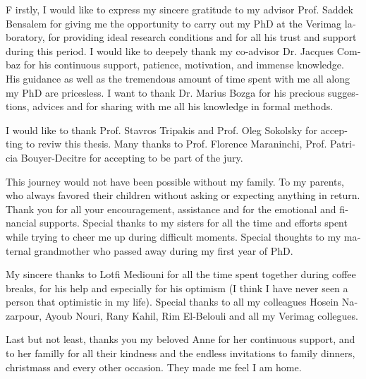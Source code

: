 \begin{acknowledgements}
\begin{otherlanguage}{french}
\ackfont
\large
\lettrine[lines=3,loversize=0.2]{\color{BrickRed}F}{} irstly, I would like to express my 
sincere gratitude to my advisor Prof. Saddek Bensalem for giving me the opportunity to carry 
out my PhD at the Verimag laboratory, for providing ideal research
conditions and for all his trust and support during this period. 
I would like to deepely thank my co-advisor Dr. Jacques Combaz for his continuous support, 
patience, motivation, and immense knowledge. His guidance as well as the tremendous 
amount of time spent with me all along my PhD are pricesless.
I want to thank Dr. Marius Bozga for his precious suggestions, advices and for 
sharing with me all his knowledge in formal methods.

I would like to thank Prof. Stavros Tripakis and Prof. Oleg Sokolsky for accepting to reviw this
thesis. Many thanks to Prof. Florence Maraninchi, Prof. Patricia Bouyer-Decitre for accepting 
to be part of the jury.
  
This journey would not have been possible without my family. To my parents, who always favored
their children without asking or expecting anything in return. Thank you for all your 
encouragement, assistance and for the emotional and financial supports. Special thanks to my 
sisters for all the time and efforts spent while trying to cheer me up during difficult moments.
Special thoughts to my maternal grandmother who passed away during my first year of PhD.
  
My sincere thanks to Lotfi Mediouni for all the time spent together during coffee breaks, for
his help and especially for his optimism (I think I have never seen a person that optimistic
in my life). Special thanks to all my colleagues Hosein Nazarpour, Ayoub Nouri, Rany Kahil, 
Rim El-Belouli and all my Verimag collegues.

Last but not least, thanks you my beloved Anne for her continuous support, and to her familly
for all their kindness and the endless invitations to family dinners, christmass and every other
occasion. They made me feel I am home.
     
\end{otherlanguage}
\end{acknowledgements}

